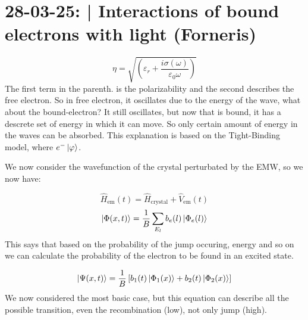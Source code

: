 \section{28-03-25: | Interactions of bound electrons with light (Forneris)}

\begin{equation}
    \eta = \sqrt{\left(\varepsilon_r + \frac{i\sigma(\omega)}{\varepsilon_0\omega}\right)}
\end{equation}
The first term in the parenth. is the polarizability and the second describes the free electron. So in free electron, it oscillates due to the energy of the wave, what about the bound-electron?
It still oscillates, but now that is bound, it has a descrete set of energy in which it can move. So only certain amount of energy in the waves can be absorbed. This explanation is based on the Tight-Binding model, where $e^-\ket{\varphi}$.

We now consider the wavefunction of the crystal perturbated by the EMW, so we now have:

\begin{equation}
    \hat{H}_{\text{em}}(t) =  \hat{H}_{\text{crystal}} + \hat{V}_{\text{em}}(t)
\end{equation}
\begin{equation}
    \ket{\Phi(x,t)} = \frac{1}{B}\sum_{E_l} b_e(l)\ket{\Phi_e(l)}
\end{equation}
This says that based on the probability of the jump occuring, energy and so on we can calculate the probability of the electron to be found in an excited state.

\begin{equation}
    \ket{\Psi(x, t)} = \frac{1}{B} \left[b_1(t) \ket{\Phi_1 (x)} + b_2(t) \ket{\Phi_2 (x)}\right]
\end{equation}
We now considered the most basic case, but this equation can describe all the possible transition, even the recombination (low), not only jump (high).

